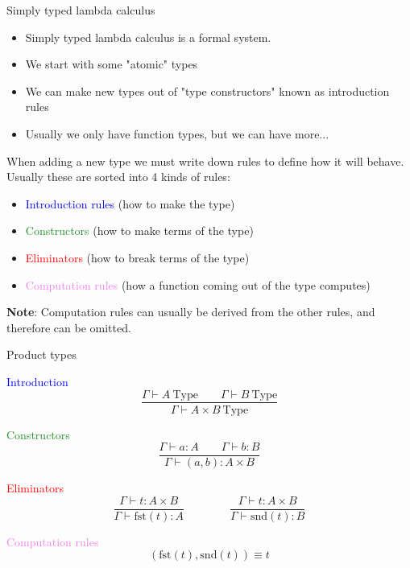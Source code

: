 \documentclass[usenames,dvipsnames]{beamer}
\newcommand{\blu}[1]{\textcolor{blue}{#1}}
\newcommand{\gre}[1]{\textcolor{ForestGreen}{#1}}
\newcommand{\red}[1]{\textcolor{red}{#1}}
\newcommand{\yel}[1]{\textcolor{violet}{#1}}
\begin{document}
    \begin{frame}{Simply typed lambda calculus}
        \begin{itemize}
            \item Simply typed lambda calculus is a formal system.
            \item We start with some "atomic" types
            \item We can make new types out of "type constructors" known as introduction rules
            \item Usually we only have function types, but we can have more...
        \end{itemize}
        When adding a new type we must write down rules to define how it will behave.
        Usually these are sorted into 4 kinds of rules:
        \begin{itemize}
            \item \blu{Introduction rules} (how to make the type)
            \item \gre{Constructors} (how to make terms of the type)
            \item \red{Eliminators} (how to break terms of the type)
            \item \yel{Computation rules} (how a function coming out of the type computes)
        \end{itemize}
        \textbf{Note}: Computation rules can usually be derived from the other rules, and therefore can be omitted.
    \end{frame}

    \begin{frame}{Product types}
        \begin{block}{\blu{Introduction}}
            $$\frac{\Gamma \vdash A\ \text{Type}\qquad \Gamma \vdash B\ \text{Type} }{\Gamma \vdash A \times B\ \text{Type}}$$
        \end{block}
        
        \begin{block}{\gre{Constructors}}
            $$\frac{\Gamma \vdash a : A\qquad \Gamma \vdash b : B}{\Gamma\vdash (a,b) : A\times B}$$
        \end{block}
        
        \begin{block}{\red{Eliminators}}
            $$\frac{\Gamma \vdash t : A \times B}{\Gamma\vdash\text{fst}(t) : A} \qquad\qquad
              \frac{\Gamma \vdash t : A \times B}{\Gamma\vdash\text{snd}(t) : B}$$
        \end{block}
        
        \begin{block}{\yel{Computation rules}}
            $$(\text{fst}(t), \text{snd}(t)) \equiv t$$
        \end{block}
    \end{frame}    
    
\end{document}
